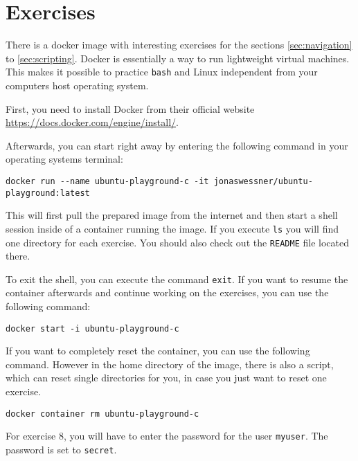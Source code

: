 \section{Exercises}

There is a docker image with interesting exercises for the sections \ref{sec:navigation} to \ref{sec:scripting}. Docker is essentially a way to run lightweight virtual machines. This makes it possible to practice \lstinline{bash} and Linux independent from your computers host operating system.

First, you need to install Docker from their official website \url{https://docs.docker.com/engine/install/}.

Afterwards, you can start right away by entering the following command in your operating systems terminal:

\begin{lstlisting}
docker run --name ubuntu-playground-c -it jonaswessner/ubuntu-playground:latest
\end{lstlisting}

This will first pull the prepared image from the internet and then start a shell session inside of a container running the image. If you execute \lstinline{ls} you will find one directory for each exercise. You should also check out the \lstinline{README} file located there.

To exit the shell, you can execute the command \lstinline{exit}. If you want to resume the container afterwards and continue working on the exercises, you can use the following command:

\begin{lstlisting}
docker start -i ubuntu-playground-c
\end{lstlisting}


If you want to completely reset the container, you can use the following command. However in the home directory of the image, there is also a script, which can reset single directories for you, in case you just want to reset one exercise.

\begin{lstlisting}
docker container rm ubuntu-playground-c
\end{lstlisting}

For exercise 8, you will have to enter the password for the user \lstinline{myuser}. The password is set to \lstinline{secret}.
